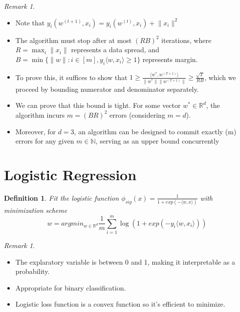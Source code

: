 \documentclass{article}
\newtheorem{definition}{Definition}
\theoremstyle{remark}
\newtheorem{remark}[example]{Remark}
\begin{document}
\begin{remark}
\begin{itemize}
\item Note that $y_i(w^{(t+1)}, x_i)=y_i(w^{(t)}, x_i)+\lVert x_i\rVert^2$
\item The algorithm must stop after at most $(RB)^2$ iterations, where $R=\max_i\lVert x_i\rVert$ represents a data spread, and \\
$B=\min\{\lVert w\rVert: i\in [m], y_i\langle w,x_i\rangle\geq 1\}$ represents 
margin.
\item To prove this, it suffices to show that $1\geq\frac{\langle w^*, w^{(T+1)}\rangle}{\lVert w^*\rVert\lVert w^{(T+1)}\rVert}\geq\frac{\sqrt T}{RB}$, which we proceed by bounding numerator and denominator separately.
\item We can prove that this bound is tight. For some vector $w^* \in \mathbb{R}^d$, the algorithm incurs $m = (BR)^2$ errors (considering $m = d$).
\item Moreover, for $d = 3$, an algorithm can be designed to commit exactly (m) errors for any given $m \in \mathbb{N}$, serving as an upper bound concurrently        \end{itemize}
\end{remark}

\section*{Logistic Regression}
\begin{definition}
Fit the logistic function $\phi_{sig}(x)=\frac 1{1+exp(-\langle w,x\rangle)}$
 with minimization scheme 
\[
w=argmin_{w\in\mathbb{R}^d} \frac 1m\sum^m_{i=1}
\log(1+exp(-y_i\langle w,x_i\rangle))
\]
\end{definition}
\begin{remark}
\begin{itemize}
\item The explaratory variable is between 0 and 1, making it interpretable as a probability.
\item Appropriate for binary classification.
\item Logistic loss function is a convex function so it's efficient to minimize.
\end{itemize}
\end{remark}
\end{document}
